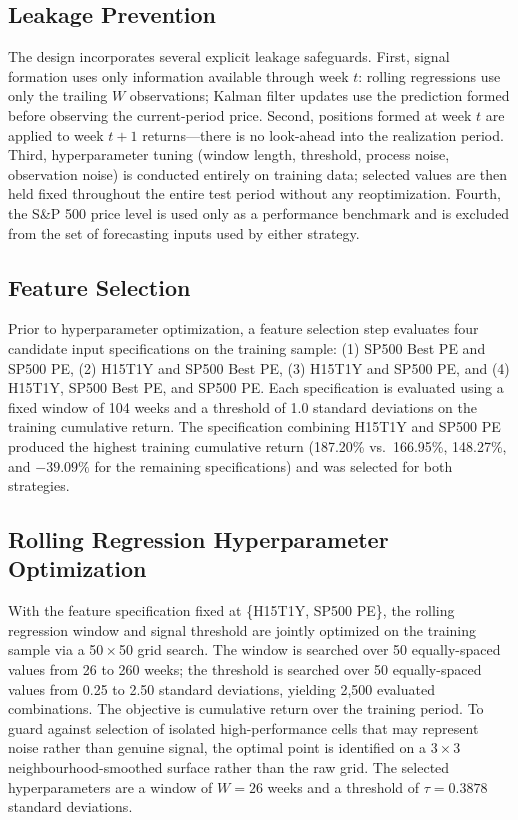 \documentclass[12pt]{article}
\begin{document}
\subsection{Leakage Prevention}

The design incorporates several explicit leakage safeguards. First, signal formation uses only information available through week $t$: rolling regressions use only the trailing $W$ observations; Kalman filter updates use the prediction formed before observing the current-period price. Second, positions formed at week $t$ are applied to week $t+1$ returns—there is no look-ahead into the realization period. Third, hyperparameter tuning (window length, threshold, process noise, observation noise) is conducted entirely on training data; selected values are then held fixed throughout the entire test period without any reoptimization. Fourth, the S\&P 500 price level is used only as a performance benchmark and is excluded from the set of forecasting inputs used by either strategy.

\subsection{Feature Selection}

Prior to hyperparameter optimization, a feature selection step evaluates four candidate input specifications on the training sample: (1) SP500 Best PE and SP500 PE, (2) H15T1Y and SP500 Best PE, (3) H15T1Y and SP500 PE, and (4) H15T1Y, SP500 Best PE, and SP500 PE. Each specification is evaluated using a fixed window of 104 weeks and a threshold of 1.0 standard deviations on the training cumulative return. The specification combining H15T1Y and SP500 PE produced the highest training cumulative return (187.20\% vs.\ 166.95\%, 148.27\%, and $-39.09\%$ for the remaining specifications) and was selected for both strategies.

\subsection{Rolling Regression Hyperparameter Optimization}

With the feature specification fixed at \{H15T1Y, SP500 PE\}, the rolling regression window and signal threshold are jointly optimized on the training sample via a 50\,$\times$\,50 grid search. The window is searched over 50 equally-spaced values from 26 to 260 weeks; the threshold is searched over 50 equally-spaced values from 0.25 to 2.50 standard deviations, yielding 2,500 evaluated combinations. The objective is cumulative return over the training period. To guard against selection of isolated high-performance cells that may represent noise rather than genuine signal, the optimal point is identified on a $3\times3$ neighbourhood-smoothed surface rather than the raw grid. The selected hyperparameters are a window of $W = 26$ weeks and a threshold of $\tau = 0.3878$ standard deviations.
\end{document}
